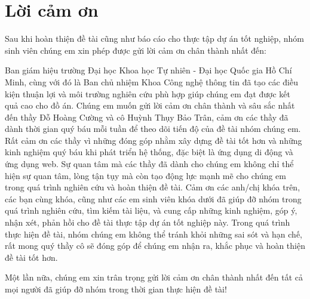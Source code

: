 \chapter*{Lời cảm ơn}
\label{thanks}
Sau khi hoàn thiện đề tài cũng như báo cáo cho thực tập dự án tốt nghiệp, nhóm sinh viên chúng em xin phép được gửi lời cảm ơn chân thành nhất đến:

Ban giám hiệu trường Đại học Khoa học Tự nhiên - Đại học Quốc gia Hồ Chí Minh, cùng với đó là Ban chủ nhiệm Khoa Công nghệ thông tin đã tạo các điều kiện thuận lợi và môi trường nghiên cứu phù hợp giúp chúng em đạt được kết quả cao cho đồ án. Chúng em muốn gửi lời cảm ơn chân thành và sâu sắc nhất đến thầy Đỗ Hoàng Cường và cô Huỳnh Thụy Bảo Trân, cảm ơn các thầy đã dành thời gian quý báu mỗi tuần để theo dõi tiến độ của đề tài nhóm chúng em. Rất cảm ơn các thầy vì những đóng góp nhằm xây dựng đề tài tốt hơn và những kinh nghiệm quý báu khi phát triển hệ thống, đặc biệt là ứng dụng di động và ứng dụng web. Sự quan tâm mà các thầy đã dành cho chúng em không chỉ thể hiện sự quan tâm, lòng tận tụy mà còn tạo động lực mạnh mẽ cho chúng em trong quá trình nghiên cứu và hoàn thiện đề tài. Cảm ơn các anh/chị khóa trên, các bạn cùng khóa, cũng như các em sinh viên khóa dưới đã giúp đỡ nhóm trong quá trình nghiên cứu, tìm kiếm tài liệu, và cung cấp những kinh nghiệm, góp ý, nhận xét, phản hồi cho đề tài thực tập dự án tốt nghiệp này. Trong quá trình thực hiện đề tài, nhóm chúng em không thể tránh khỏi những sai sót và hạn chế, rất mong quý thầy cô sẽ đóng góp để chúng em nhận ra, khắc phục và hoàn thiện đề tài tốt hơn.


Một lần nữa, chúng em xin trân trọng gửi lời cảm ơn chân thành nhất đến tất cả mọi người đã giúp đỡ nhóm trong thời gian thực hiện đề tài!